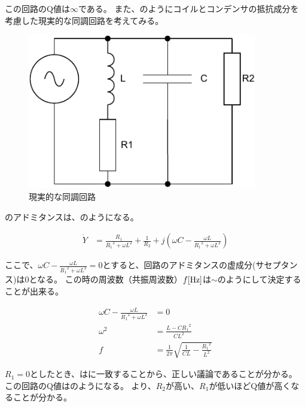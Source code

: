 \documentclass[report.tex]{subfiles}
\begin{document}
この回路のQ値は\(\infty\)である。
また、のようにコイルとコンデンサの抵抗成分を考慮した現実的な同調回路を考えてみる。

\begin{figure}[H]
	\centering
	\includegraphics[width=10cm]{fig/kyo2.pdf}
	\caption{現実的な同調回路}
	\label{fig:kyo2}
\end{figure}

のアドミタンスは、のようになる。

\begin{align}
	\dot{Y} & = \frac{R_1}{{R_1}^2+ {\omega L}^2} + \frac{1}{R_2} + j(\omega C - \frac{\omega L}{{R_1}^2+ {\omega L}^2})\label{eq:impedance2}
\end{align}

ここで、$\omega C - \frac{\omega L}{{R_1}^2+ {\omega L}^2} = 0$とすると、回路のアドミタンスの虚成分(サセプタンス)は0となる。
この時の周波数（共振周波数）\(f\rm{[Hz]}\)は\(\sim\)のようにして決定することが出来る。

\begin{align}
	\omega C - \frac{\omega L}{{R_1}^2+ {\omega L}^2} & = 0 \label{eq:kyousin}                                                           \\
	\omega ^2                                         & = \frac{L - {CR_1}^2}{CL^2}                                                      \\
	f                                                 & = \frac{1}{2 \pi} \sqrt{\frac{1}{CL} - {\frac{{R_1}^2}{L^2}}}\label{eq:kyousin2}
\end{align}

$R_1 = 0$としたとき、はに一致することから、正しい議論であることが分かる。
この回路のQ値はのようになる。
より、\(R_2\)が高い、\(R_1\)が低いほどQ値が高くなることが分かる。
\end{document}
